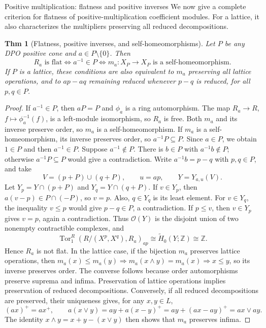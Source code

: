 \documentclass[10pt,letterpaper]{amsart}
\makeatletter
\numberwithin{equation}{section}
\newtheorem{thm}{Thm}[section]
\theoremstyle{definition}
\newcommand{\Z}{\mathbb Z}
\newcommand{\Tor}{\operatorname{Tor}}
\newcommand{\ord}{\mathcal O}
\def\subsection{\@startsection{subsection}{2}
  \z@{.9\linespacing\@plus.3\linespacing}{.4\linespacing}
  {\normalfont\fontsize{11.5}{14}\selectfont\bfseries\boldmath\raggedright}}
\makeatother
\begin{document}
\subsection{Positive multiplication: flatness and positive inverses}
We now give a complete criterion for flatness of positive-multiplication coefficient modules. For a lattice, it also characterizes the multipliers preserving all reduced decompositions.

\begin{thm}[Flatness, positive inverses, and self-homeomorphisms]\label{thm:flat-mult}
Let $P$ be any DPO positive cone and $a\in P\setminus\{0\}$. Then
\[
R_a\text{ is flat}\iff a^{-1}\in P\iff m_a:X_P\to X_P\text{ is a self-homeomorphism}.
\]
If $P$ is a lattice, these conditions are also equivalent to $m_a$ preserving all lattice operations, and to $ap-aq$ remaining reduced whenever $p-q$ is reduced, for all $p,q\in P$.
\end{thm}
\begin{proof}
If $a^{-1}\in P$, then $aP=P$ and $\phi_a$ is a ring automorphism. The map $R_a\to R$, $f\mapsto\phi_a^{-1}(f)$, is a left-module isomorphism, so $R_a$ is free. Both $m_a$ and its inverse preserve order, so $m_a$ is a self-homeomorphism.
If $m_a$ is a self-homeomorphism, its inverse preserves order, so $a^{-1}P\subseteq P$. Since $a\in P$, we obtain $1\in P$ and then $a^{-1}\in P$.
Suppose $a^{-1}\notin P$. There is $b\in P$ with $a^{-1}b\notin P$; otherwise $a^{-1}P\subseteq P$ would give a contradiction. Write $a^{-1}b=p-q$ with $p,q\in P$, and take
\[
V=(p+P)\cup(q+P),\qquad u=ap,\qquad Y=Y_{a,u}(V).
\]
Let $Y_p=Y\cap(p+P)$ and $Y_q=Y\cap(q+P)$. If $v\in Y_p$, then $a(v-p)\in P\cap(-P)$, so $v=p$. Also, $q\in Y_q$ is its least element.
For $v\in Y_q$, the inequality $v\le p$ would give $p-q\in P$, a contradiction. If $p\le v$, then $v\in Y_p$ gives $v=p$, again a contradiction. Thus $\ord(Y)$ is the disjoint union of two nonempty contractible complexes, and
\[
\Tor_1^R(R/(X^p,X^q),R_a)_{ap}
\cong\widetilde H_0(Y;\Z)\cong\Z.
\]
Hence $R_a$ is not flat.
In the lattice case, if the bijection $m_a$ preserves lattice operations, then
$m_a(x)\le m_a(y)\Rightarrow m_a(x\wedge y)=m_a(x)\Rightarrow x\le y$, so its inverse preserves order. The converse follows because order automorphisms preserve suprema and infima.
Preservation of lattice operations implies preservation of reduced decompositions. Conversely, if all reduced decompositions are preserved, their uniqueness gives, for any $x,y\in L$,
\[
(ax)^+=ax^+,\qquad
a(x\vee y)=ay+a(x-y)^+=ay+(ax-ay)^+=ax\vee ay.
\]
The identity $x\wedge y=x+y-(x\vee y)$ then shows that $m_a$ preserves infima.
\end{proof}
\end{document}
